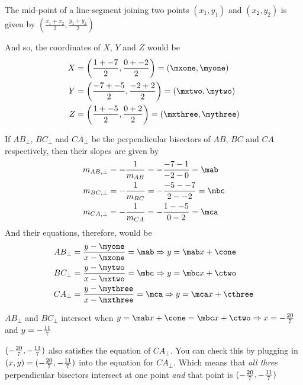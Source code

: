 \begin{solution}[\mcq]
	
		The mid-point of a line-segment joining two points $(x_1, y_1)$ and $(x_2, y_2)$ is given 
		by $\left( \frac{x_1 + x_2}{2}, \frac{y_1 + y_2}{2}\right)$
		
		And so, the coordinates of $X$, $Y$ and $Z$ would be 
		\begin{align}
			X &= \left( \frac{\vbone + \vbthree}{2}, \frac{\vbtwo + \vbfour}{2} \right) = (\mxone, \myone) \\
			Y &= \left( \frac{\vbthree + \vbfive}{2}, \frac{\vbfour + \vbsix}{2} \right) = (\mxtwo, \mytwo) \\
			Z &= \left( \frac{\vbone + \vbfive}{2}, \frac{\vbtwo + \vbsix}{2} \right) = (\mxthree, \mythree)
		\end{align}
	
		If $AB_\perp$, $BC_\perp$ and $CA_\perp$ be the perpendicular bisectors of $AB$, $BC$ and $CA$ respectively, then 
		their slopes are given by
		\begin{align}
			m_{AB,\perp} &= -\frac{1}{m_{AB}} = -\dfrac{\vbthree - \vbone}{\vbfour - \vbtwo} = \mab \\
			m_{BC,\perp} &= -\frac{1}{m_{BC}} = -\dfrac{\vbfive - \vbthree}{\vbsix - \vbfour} = \mbc \\
			m_{CA,\perp} &= -\frac{1}{m_{CA}} = -\dfrac{\vbone - \vbfive}{\vbtwo - \vbsix} = \mca
		\end{align}
		And their equations, therefore, would be 
		\begin{align}
			AB_\perp &= \dfrac{y-\myone}{x-\mxone} = \mab \Rightarrow y = \mab x + \cone \\
			BC_\perp &= \dfrac{y-\mytwo}{x-\mxtwo} = \mbc \Rightarrow y = \mbc x + \ctwo \\
			CA_\perp &= \dfrac{y-\mythree}{x-\mxthree} = \mca \Rightarrow y = \mca x + \cthree					
		\end{align}
	
		$AB_\perp$ and $BC_\perp$ intersect when $ y = \mab x + \cone = \mbc x + \ctwo \Rightarrow x = \vbseven$ 
		and $y = -\frac{11}{7}$
		
		$(-\frac{20}{7}, -\frac{11}{7})$ also satisfies the equation of $CA_\perp$. You can check this by plugging in 
		$(x,y) = (-\frac{20}{7}, -\frac{11}{7})$ into the equation for $CA_\perp$. Which means that \textit{all three} 
		perpendicular bisectors intersect at one point \textit{and} that point is $(-\frac{20}{7}, -\frac{11}{7})$
\end{solution}

